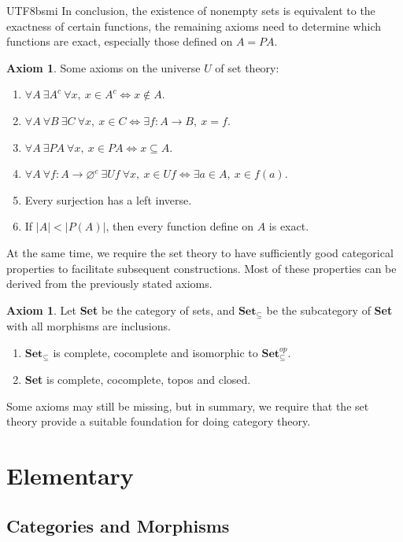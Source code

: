 \documentclass[12pt]{article}
\theoremstyle{definition}
\newtheorem{axiom}[definition]{Axiom}
\newcommand\<{\langle}
\renewcommand\>{\rangle}
\begin{document}
\begin{CJK}{UTF8}{bsmi}
In conclusion, the existence of nonempty sets is equivalent to the exactness of certain functions, the remaining axioms need to determine which functions are exact, especially those defined on $A=PA$.

\begin{axiom}
Some axioms on the universe $U$ of set theory:
\begin{enumerate}
    \item $\forall A\ \exists A^c\ \forall x,\ x\in A^c\iff x\notin A$.
    \item $\forall A\ \forall B\ \exists C\ \forall x,\ x\in C\iff\exists f:A\to B,\ x=f$.
    \item $\forall A\ \exists PA\ \forall x,\ x\in PA\iff x\subseteq A$.
    \item $\forall A\ \forall f:A\to\varnothing^c\ \exists Uf\ \forall x,\ x\in Uf\iff\exists a\in A,\ x\in f(a)$.
    \item Every surjection has a left inverse.
    \item If $|A|<|P(A)|$, then every function define on $A$ is exact.
\end{enumerate}
\end{axiom}

At the same time, we require the set theory to have sufficiently good categorical properties to facilitate subsequent constructions. Most of these properties can be derived from the previously stated axioms.

\begin{axiom}
    Let \textbf{Set} be the category of sets, and $\textbf{Set}_\subseteq$ be the subcategory of \textbf{Set} with all morphisms are inclusions.
    \begin{enumerate}
        \item $\textbf{Set}_\subseteq$ is complete, cocomplete and isomorphic to $\textbf{Set}_\subseteq^{op}$.
        \item \textbf{Set} is complete, cocomplete, topos and closed.
    \end{enumerate}
\end{axiom}

Some axioms may still be missing, but in summary, we require that the set theory provide a suitable foundation for doing category theory.

\section{Elementary}

\subsection{Categories and Morphisms}


\end{CJK}
\end{document}
